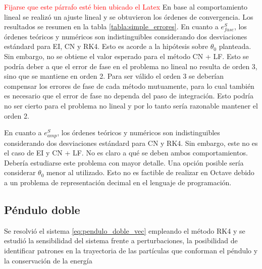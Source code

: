 \documentclass[aps,prb,twocolumn,superscriptaddress,floatfix,longbibliography,10pt]{revtex4-2}
\newcounter{para}
\begin{document}
\twocolumngrid


\hfill

\textcolor{red}{Fijarse que este párrafo esté bien ubicado el Latex} En base al comportamiento lineal se realizó un ajuste lineal y se obtuvieron los órdenes de convergencia. Los resultados se resumen en la tabla \ref{tabla:simple_errores}. En cuanto a $e^S_{fase}$, los órdenes teóricos y numéricos son indistinguibles considerando dos desviaciones estándard para EI, CN y RK4. Esto es acorde a la hipótesis sobre $\theta_0$ planteada. Sin embargo, no se obtiene el valor esperado para el método CN + LF. Esto se podría deber a que el error de fase en el problema no lineal no resulta de orden 3, sino que se mantiene en orden 2. Para ser válido el orden 3 se deberían compensar los errores de fase de cada método mutuamente, para lo cual también es necesario que el error de fase no dependa del paso de integración. Esto podría no ser cierto para el problema no lineal y por lo tanto sería razonable mantener el orden 2.

En cuanto a $e^S_{amp}$, los órdenes teóricos y numéricos son indistinguibles considerando dos desviaciones estándard para CN y RK4. Sin embargo, este no es el caso de EI y CN + LF. No es claro a qué se deben ambos comportamientos. Debería estudiarse este problema con mayor detalle. Una opción posible sería considerar $\theta_0$ menor al utilizado. Esto no es factible de realizar en Octave debido a un problema de representación decimal en el lenguaje de programación.





\subsection{Péndulo doble}

Se resolvió el sistema \ref{eq:pendulo_doble_vec} empleando el método RK4 y se estudió la sensibilidad del sistema frente a perturbaciones, la posibilidad de identificar patrones en la trayectoria de las partículas que conforman el péndulo y la conservación de la energía
\end{document}
